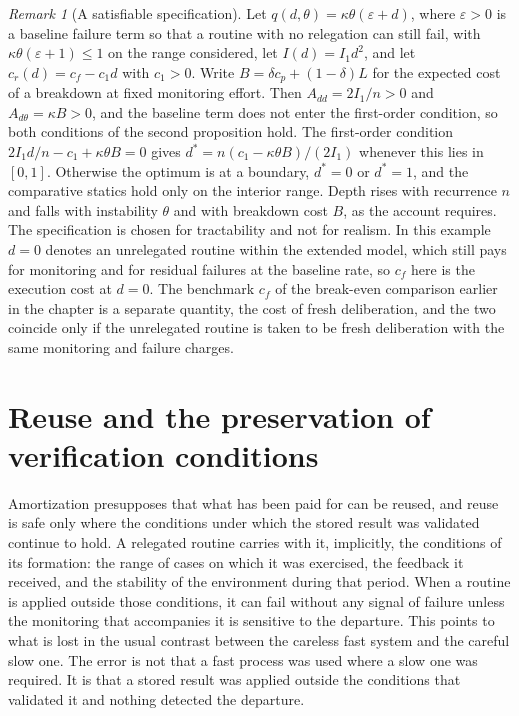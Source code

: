 \documentclass[11pt]{report}
\theoremstyle{remark}
\newtheorem{remark}{Remark}[chapter]
\theoremstyle{definition}
\begin{document}
\begin{remark}[A satisfiable specification]
Let $q(d,\theta)=\kappa\theta(\varepsilon+d)$, where $\varepsilon>0$ is a baseline failure term so that a routine with no relegation can still fail, with $\kappa\theta(\varepsilon+1)\le 1$ on the range considered, let $I(d)=I_1 d^2$, and let $c_r(d)=c_f-c_1 d$ with $c_1>0$. Write $B=\delta c_p+(1-\delta)L$ for the expected cost of a breakdown at fixed monitoring effort. Then $A_{dd}=2I_1/n>0$ and $A_{d\theta}=\kappa B>0$, and the baseline term does not enter the first-order condition, so both conditions of the second proposition hold. The first-order condition $2I_1 d/n-c_1+\kappa\theta B=0$ gives $d^*=n(c_1-\kappa\theta B)/(2I_1)$ whenever this lies in $[0,1]$. Otherwise the optimum is at a boundary, $d^*=0$ or $d^*=1$, and the comparative statics hold only on the interior range. Depth rises with recurrence $n$ and falls with instability $\theta$ and with breakdown cost $B$, as the account requires. The specification is chosen for tractability and not for realism. In this example $d=0$ denotes an unrelegated routine within the extended model, which still pays for monitoring and for residual failures at the baseline rate, so $c_f$ here is the execution cost at $d=0$. The benchmark $c_f$ of the break-even comparison earlier in the chapter is a separate quantity, the cost of fresh deliberation, and the two coincide only if the unrelegated routine is taken to be fresh deliberation with the same monitoring and failure charges.
\end{remark}

\section{Reuse and the preservation of verification conditions}

Amortization presupposes that what has been paid for can be reused, and reuse is safe only where the conditions under which the stored result was validated continue to hold. A relegated routine carries with it, implicitly, the conditions of its formation: the range of cases on which it was exercised, the feedback it received, and the stability of the environment during that period. When a routine is applied outside those conditions, it can fail without any signal of failure unless the monitoring that accompanies it is sensitive to the departure. This points to what is lost in the usual contrast between the careless fast system and the careful slow one. The error is not that a fast process was used where a slow one was required. It is that a stored result was applied outside the conditions that validated it and nothing detected the departure.
\end{document}

